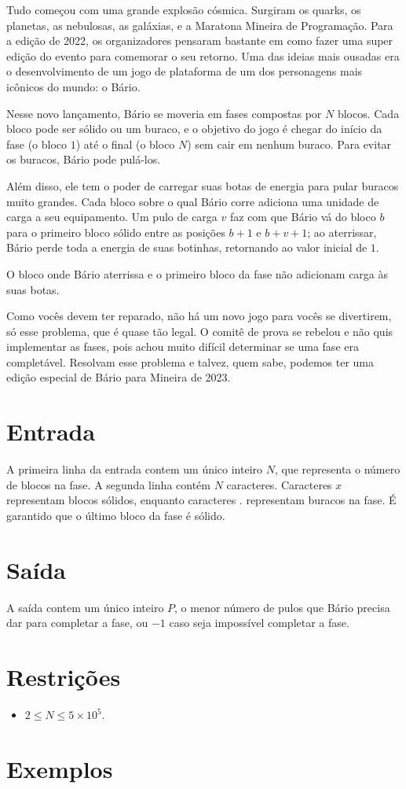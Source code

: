 Tudo começou com uma grande explosão cósmica. Surgiram os quarks, os planetas, as nebulosas, as galáxias, e a Maratona Mineira de Programação.
Para a edição de 2022, os organizadores pensaram bastante em como fazer uma super edição do evento para comemorar o seu retorno. Uma das ideias mais
ousadas era o desenvolvimento de um jogo de plataforma de um dos personagens mais icônicos do mundo: o Bário.

Nesse novo lançamento, Bário se moveria em fases compostas por $N$ blocos. Cada bloco pode ser sólido ou um buraco, e o objetivo do jogo é chegar do início da fase (o bloco $1$) até o final (o bloco $N$) sem cair em nenhum buraco.
Para evitar os buracos, Bário pode pulá-los.

Além disso, ele tem o poder de carregar suas botas de energia para pular buracos muito grandes. Cada bloco sobre o qual Bário corre adiciona uma unidade de carga a seu equipamento. Um pulo de carga $v$ faz com que Bário vá do bloco $b$ para o primeiro bloco sólido entre as posições $b+1$ e $b+v+1$;
ao aterrissar, Bário perde toda a energia de suas botinhas, retornando ao valor inicial de $1$.

O bloco onde Bário aterrissa e o primeiro bloco da fase não adicionam carga às suas botas.

Como vocês devem ter reparado, não há um novo jogo para vocês se divertirem, só esse problema, que é quase tão legal. O comitê de prova se rebelou e não quis implementar as fases, pois achou muito difícil determinar se uma fase era completável.
Resolvam esse problema e talvez, quem sabe, podemos ter uma edição especial de Bário para Mineira de 2023.

\section*{Entrada}

A primeira linha da entrada contem um único inteiro $N$, que representa o número de blocos na fase.
A segunda linha contém $N$ caracteres. Caracteres $x$ representam blocos sólidos, enquanto caracteres $.$ representam buracos na fase. É garantido que o último bloco da fase é sólido.

\section*{Saída}

A saída contem um único inteiro $P$, o menor número de pulos que Bário precisa dar para completar a fase, ou $-1$ caso seja impossível completar a fase.

\section*{Restrições}

\begin{itemize}
\item $2 \leq N \leq 5 \times 10^5$.
\end{itemize}


\section*{Exemplos}

\exemplo
